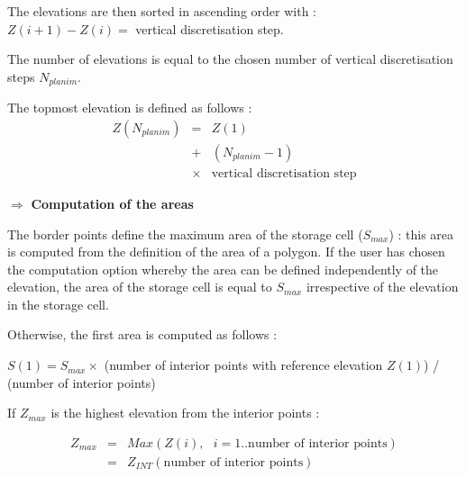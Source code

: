 The elevations are then sorted in ascending order with : \\
$Z(i+1)-Z(i) = $ vertical discretisation step.

\vspace{0.5cm}

The number of elevations is equal to the chosen number of vertical discretisation steps $N_{planim}$.

\vspace{0.5cm}

The topmost elevation is defined as follows :
 \begin{eqnarray}
 Z(N_{planim}) & = & Z(1) \nonumber \\
                & + & (N_{planim}-1) \nonumber \\
                & \times & \mbox{vertical discretisation step} \nonumber
 \end{eqnarray}

\vspace{0.5cm}

$\Longrightarrow$ \textbf{Computation of the areas}

\vspace{0.5cm}

The border points define the maximum area of the storage cell ($S_{max}$) : this area is computed from the definition of the area of a polygon. If the user has chosen the computation option whereby the area can be defined independently of the elevation, the area of the storage cell is equal to $S_{max}$ irrespective of the elevation in the storage cell.

\vspace{0.5cm}

Otherwise, the first area is computed as follows :

\vspace{0.5cm}

$S(1) = S_{max} \times$ (number of interior points with reference elevation $Z(1)$) / (number of interior points)

\vspace{0.5cm}

If $Z_{max}$ is the highest elevation from the interior points :

\begin{eqnarray}
Z_{max} & = & Max(Z(i),\mbox{ }i = 1..\mbox{number of interior points}) \nonumber \\
        & = & Z_{INT}(\mbox{number of interior points}) \nonumber
\end{eqnarray}

